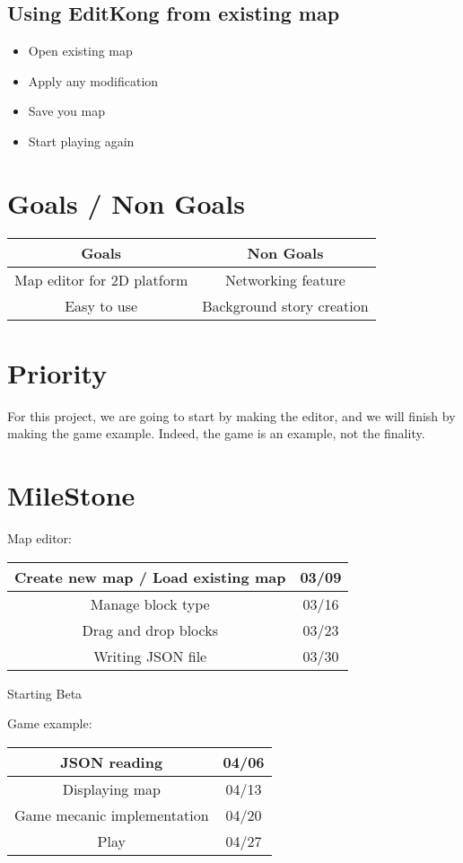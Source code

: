 \subsection{Using EditKong from existing map}

\begin{itemize}
\item Open existing map
\item Apply any modification
\item Save you map
\item Start playing again
\end{itemize}

\section{Goals / Non Goals}

\begin{center}
	\begin{tabular}{| c | c |}
			\hline \rowcolor{LightGrey} Goals & Non Goals \\
			\hline Map editor for 2D platform & Networking feature \\
			\hline Easy to use & Background story creation \\
			\hline
	\end{tabular}
\end{center}

\section{Priority}
For this project, we are going to start by making the editor, and we will finish by making the game example. Indeed, the game is an example, not the finality.
\section{MileStone}
Map editor:
\begin{center}
\begin{tabular}{|*{2}{c|}}
    \hline
     Create new map / Load existing map & 03/09 \\
    \hline
     Manage block type & 03/16 \\
    \hline
	Drag and drop blocks & 03/23 \\ 
    \hline
     Writing JSON file & 03/30 \\
    \hline
\end{tabular}
\end{center}
Starting Beta

Game example:
\begin{center}
\begin{tabular}{|*{2}{c|}}
    \hline
    JSON reading & 04/06\\
    \hline
     Displaying map & 04/13 \\
    \hline
	Game mecanic implementation & 04/20 \\ 
    \hline
     Play & 04/27\\
    \hline
\end{tabular}
\end{center}
